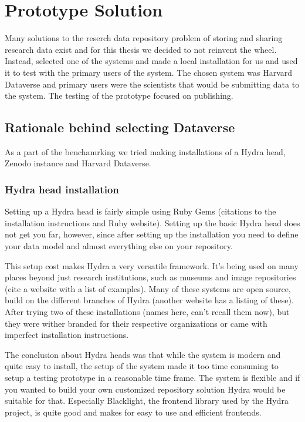 \chapter{Prototype Solution}
\label{chapter:prototype}

Many solutions to the reserch data repository problem of storing and sharing
research data exist and for this thesis we decided to not reinvent the wheel.
Instead, selected one of the systems and made a local installation for us and
used it to test with the primary users of the system. The chosen system was
Harvard Dataverse and primary users were the scientists that would be
submitting data to the system. The testing of the prototype focused on
publishing.

\section{Rationale behind selecting Dataverse}

As a part of the benchamrking we tried making installations of a Hydra head,
Zenodo instance and Harvard Dataverse.

\subsection{Hydra head installation}

Setting up a Hydra head is fairly simple using Ruby Gems (citations to the
installation instructions and Ruby website). Setting up the basic Hydra head
does not get you far, however, since after setting up the installation you need
to define your data model and almost everything else on your repository.

This setup cost makes Hydra a very versatile framework. It's being used on many
places beyond just research institutions, such as museums and image
repositories (cite a website with a list of examples). Many of these systems
are open source, build on the different branches of Hydra (another website has
a listing of these). After trying two of these installations (names here, can't
recall them now), but they were wither branded for their respective
organizations or came with imperfect installation instructions.

The conclusion about Hydra heads was that while the system is modern and quite
easy to install, the setup of the system made it too time consuming to setup a
testing prototype in a reasonable time frame. The system is flexible and if you
wanted to build your own customized repository solution Hydra would be suitable
for that. Especially Blacklight, the frontend library used by the Hydra
project, is quite good and makes for easy to use and efficient frontends.

